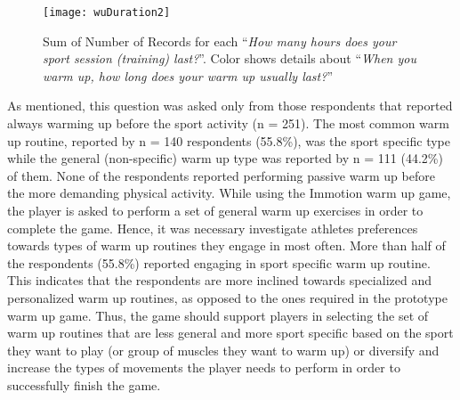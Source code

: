 \begin{figure}[h]
    \centering
    \texttt{[image: wuDuration2]}
    \caption[Results for``\textit{How many hours does your sport session (training) last?}'']{Sum of Number of Records for each ``\textit{How many hours does your sport session (training) last?}''. Color shows details about ``\textit{When you warm up, how long does your warm up usually last?}''}
    \label{fig:wuDuration2}
\end{figure}
As mentioned, this question was asked only from those respondents that reported always warming up before the sport activity (n = 251). The most common warm up routine, reported by n = 140 respondents (55.8\%), was the sport specific type while the general (non-specific) warm up type was reported by n = 111 (44.2\%) of them. None of the respondents reported performing passive warm up before the more demanding physical activity. While using the Immotion warm up game, the player is asked to perform a set of general warm up exercises in order to complete the game. Hence, it was necessary investigate athletes preferences towards types of warm up routines they engage in most often. More than half of the respondents (55.8\%) reported engaging in sport specific warm up routine. This indicates that the respondents are more inclined towards specialized and personalized warm up routines, as opposed to the ones required in the prototype warm up game. Thus, the game should support players in selecting the set of warm up routines that are less general and more sport specific based on the sport they want to play (or group of muscles they want to warm up) or diversify and increase the types of movements the player needs to perform in order to successfully finish the game. %
